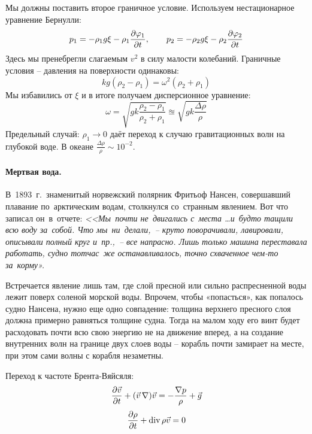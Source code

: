 Мы должны поставить второе граничное условие. Используем нестационарное уравнение Бернулли:
\begin{equation}
    p_1 = -\rho_1 g \xi - \rho_1 \pdv{\varphi_1}{t}, \qquad
    p_2 = -\rho_2 g \xi - \rho_2 \pdv{\varphi_2}{t}
\end{equation}
Здесь мы пренебрегли слагаемым $v^2$ в силу малости колебаний.
Граничные условия -- давления на поверхности одинаковы:
\begin{equation}
    kg(\rho_2-\rho_1) = \omega^2(\rho_2+\rho_1)
\end{equation}
Мы избавились от $\xi$ и в итоге получаем дисперсионное уравнение:
\begin{equation}
    \omega = \sqrt{gk\frac{\rho_2-\rho_1}{\rho_2+\rho_1}} \approxeq \sqrt{gk\frac{\Delta \rho}{\rho}}
\end{equation}
Предельный случай: $\rho_1 \to 0$ даёт переход к случаю гравитационных волн на глубокой воде. 
В океане $ \frac{\Delta\rho}{\rho}\sim 10^{-2}$.

\paragraph{Мертвая вода.} В 1893 г. знаменитый норвежский полярник Фритьоф Нансен, совершавший плавание по арктическим водам, столкнулся со странным явлением. Вот что записал он в отчете: \textit{<<Мы почти не двигались с места \dots и будто тащили всю воду за собой. Что мы ни делали, -- круто поворачивали, лавировали, описывали полный круг и пр., -- все напрасно. Лишь только машина переставала работать, судно тотчас же останавливалось, точно схваченное чем-то за корму».}

Встречается явление лишь там, где слой пресной или
сильно распресненной воды лежит поверх соленой морской воды.
Впрочем, чтобы «попасться», как попалось судно Нансена, нужно еще одно
совпадение: толщина верхнего пресного слоя должна примерно
равняться толщине судна. Тогда на малом ходу его винт будет
расходовать почти всю свою энергию не на движение вперед,
а на создание внутренних волн на границе двух слоев воды -- корабль
почти замирает на месте, при этом сами волны с корабля незаметны.

Переход к частоте Брента-Вяйсяля:
\begin{equation}
    \pdv{\vec{v}}{t}+(\vec{v}\,\nabla)\vec{v} = -\frac{\nabla p}{\rho}+\vec{g}
\end{equation}
\begin{equation}
	\pdv{\rho}{t}+\operatorname{div} \rho \vec{v} = 0
\end{equation}

